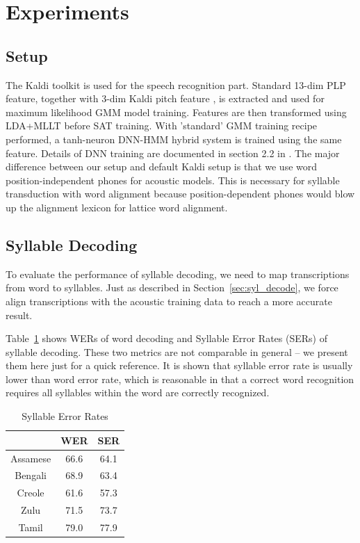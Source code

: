 \documentclass[journal]{IEEEtran}
\begin{document}
\section{Experiments}
\subsection{Setup}
The Kaldi toolkit\cite{povey2011kaldi} is used for the speech recognition part. 
Standard 13-dim PLP feature, together with 3-dim Kaldi pitch feature \cite{ghahremani2014pitch}, 
is extracted and used for maximum likelihood GMM model training. Features are then transformed 
using LDA+MLLT before SAT training. With 'standard' GMM training recipe performed, a tanh-neuron 
DNN-HMM hybrid system is trained using the same feature. Details of DNN training are documented in 
section 2.2 in \cite{zhang2014improving}. The major difference between our setup and default Kaldi 
setup is that we use word position-independent phones for acoustic models. This is necessary for syllable 
transduction with word alignment because position-dependent phones would blow up the alignment 
lexicon for lattice word alignment.

\subsection{Syllable Decoding}
To evaluate the performance of syllable decoding, we need to map transcriptions from word to syllables. Just as 
described in Section~\ref{sec:syl_decode}, we force align transcriptions with the acoustic training data to reach a 
more accurate result.

Table~\ref{tab:SER} shows WERs of word decoding and Syllable Error Rates (SERs) of syllable decoding. 
These two metrics are not comparable in general -- we present them here just for a quick reference. It is
shown that syllable error rate is usually lower than word error rate, which is reasonable in that
a correct word recognition requires all syllables within the word are correctly recognized.

\begin{table}[!t]
  \caption{Syllable Error Rates}
  \label{tab:SER}
  \centering
  \begin{tabular}{ccc}
    \hline
              & WER  & SER  \\
    \hline
    Assamese  & 66.6 & 64.1 \\
    Bengali   & 68.9 & 63.4 \\
    Creole    & 61.6 & 57.3  \\
    Zulu      & 71.5 & 73.7  \\
    Tamil     & 79.0 & 77.9  \\
    \hline
  \end{tabular}
\end{table}
\end{document}
